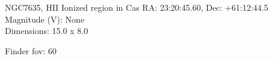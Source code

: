 \begin{block}{NGC7635, HII Ionized region in Cas}
    RA: 23:20:45.60, Dec: +61:12:44.5 \\ 
    Magnitude (V): None \\ 
    Dimensions: 15.0 x 8.0 

    Finder fov: 60 
\end{block}